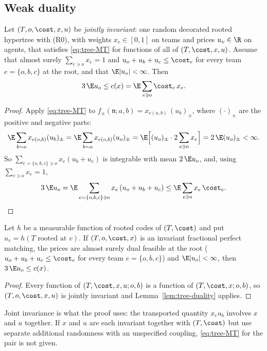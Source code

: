 \subsection{Weak duality}\label{subsec:tree-duality}

\begin{lemma}\label{lem:tree-duality}
Let $(T,o,\cost,x,u)$ be \emph{jointly invariant}: one random decorated rooted hypertree with
(R0), with weights $x_e\in[0,1]$ on teams and prices $u_v\in\R$ on agents, that satisfies
\eqref{eq:tree-MT} for functions of all of $(T,\cost,x,u)$. Assume that almost surely
$\sum_{e\ni o}x_e=1$ and $u_o+u_b+u_c\le\cost_e$ for every team $e=\{o,b,c\}$ at the root, and
that $\E|u_o|<\infty$. Then
\[
  3\,\E u_o\le c(x)=\E\sum_{e\ni o}\cost_e\,x_e .
\]
\end{lemma}

\begin{proof}
Apply \eqref{eq:tree-MT} to $f_\pm(\mathfrak{n};a,b)=x_{e(a,b)}\,(u_b)_\pm$, where
$(\cdot)_\pm$ are the positive and negative parts:
\[
  \E\sum_{b\sim o}x_{e(o,b)}(u_b)_\pm=\E\sum_{b\sim o}x_{e(o,b)}(u_o)_\pm
  =\E\Bigl[(u_o)_\pm\cdot2\sum_{e\ni o}x_e\Bigr]=2\,\E(u_o)_\pm<\infty .
\]
So $\sum_{e=\{o,b,c\}\ni o}x_e(u_b+u_c)$ is integrable with mean $2\,\E u_o$, and, using
$\sum_{e\ni o}x_e=1$,
\[
  3\,\E u_o=\E\sum_{e=\{o,b,c\}\ni o}x_e\,(u_o+u_b+u_c)\le\E\sum_{e\ni o}x_e\,\cost_e .\qedhere
\]
\end{proof}

\begin{corollary}\label{cor:tree-factor}
Let $h$ be a measurable function of rooted codes of $(T,\cost)$ and put $u_v=h(T\text{ rooted
at }v)$. If $(T,o,\cost,x)$ is an invariant fractional perfect matching, the prices are almost
surely dual feasible at the root ($u_o+u_b+u_c\le\cost_e$ for every team $e=\{o,b,c\}$) and
$\E|u_o|<\infty$, then $3\,\E u_o\le c(x)$.
\end{corollary}

\begin{proof}
Every function of $(T,\cost,x,u;o,b)$ is a function of $(T,\cost,x;o,b)$, so $(T,o,\cost,x,u)$
is jointly invariant and Lemma~\ref{lem:tree-duality} applies.
\end{proof}

\begin{remark}\label{rem:tree-duality-joint}
Joint invariance is what the proof uses: the transported quantity $x_e u_b$ involves $x$ and
$u$ together. If $x$ and $u$ are each invariant together with $(T,\cost)$ but use separate
additional randomness with an unspecified coupling, \eqref{eq:tree-MT} for the pair is not
given.
\end{remark}

